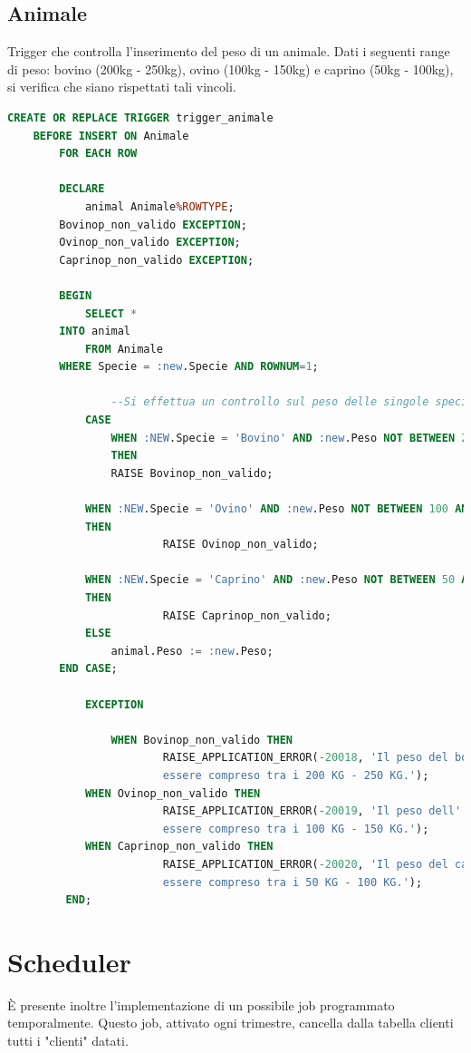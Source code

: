 \documentclass[12pt]{report}
\begin{document}
\subsection*{Animale}
Trigger che controlla l'inserimento del peso di un animale. Dati i seguenti range di peso: bovino (200kg - 250kg), ovino (100kg - 150kg) e caprino (50kg - 100kg), si verifica che siano rispettati tali vincoli.
\begin{lstlisting}[language=SQL,caption={TR\_ANIMALE}]
    CREATE OR REPLACE TRIGGER trigger_animale
	BEFORE INSERT ON Animale
        FOR EACH ROW

        DECLARE
        	animal Animale%ROWTYPE;
		Bovinop_non_valido EXCEPTION;
		Ovinop_non_valido EXCEPTION;
		Caprinop_non_valido EXCEPTION;
        
        BEGIN
        	SELECT *
		INTO animal
        	FROM Animale
		WHERE Specie = :new.Specie AND ROWNUM=1;
            
                --Si effettua un controllo sul peso delle singole specie di animali
        	CASE
        		WHEN :NEW.Specie = 'Bovino' AND :new.Peso NOT BETWEEN 200 AND 250  
        		THEN
				RAISE Bovinop_non_valido;
			
			WHEN :NEW.Specie = 'Ovino' AND :new.Peso NOT BETWEEN 100 AND 150 
			THEN
                		RAISE Ovinop_non_valido;
			
			WHEN :NEW.Specie = 'Caprino' AND :new.Peso NOT BETWEEN 50 AND 100 
			THEN
                		RAISE Caprinop_non_valido;
			ELSE
				animal.Peso := :new.Peso;
		END CASE;

        	EXCEPTION

        		WHEN Bovinop_non_valido THEN
            			RAISE_APPLICATION_ERROR(-20018, 'Il peso del bovino deve 
            			essere compreso tra i 200 KG - 250 KG.');
			WHEN Ovinop_non_valido THEN
            			RAISE_APPLICATION_ERROR(-20019, 'Il peso dell''ovino deve 
            			essere compreso tra i 100 KG - 150 KG.');
			WHEN Caprinop_non_valido THEN
            			RAISE_APPLICATION_ERROR(-20020, 'Il peso del caprino deve 
            			essere compreso tra i 50 KG - 100 KG.');
         END;
\end{lstlisting}


\section{Scheduler}
È presente inoltre l'implementazione di un possibile job programmato temporalmente. Questo job, attivato ogni trimestre, cancella dalla tabella clienti tutti i "clienti" datati.
\end{document}
